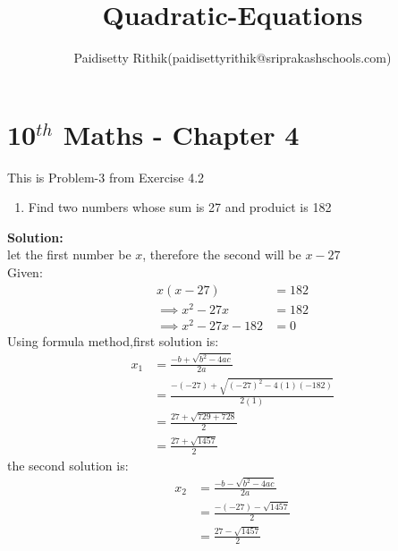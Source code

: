 \documentclass[12pt]{article}
\title{Quadratic-Equations}
\author{Paidisetty Rithik(paidisettyrithik@sriprakashschools.com)}
\newcommand{\solution}{\noindent \textbf{Solution: }}
\begin{document}
\maketitle
\section*{10$^{th}$ Maths - Chapter 4}
This is Problem-3 from Exercise 4.2
\begin{enumerate}
\item Find two numbers whose sum is 27 and produict is 182\\
\end{enumerate}
\solution \\
let the first number be $x$,
therefore the second will be $x-27$\\
Given:\\
\begin{align}
x(x-27) &= 182\\
\implies x^2-27x &= 182\\
\implies  x^2-27x-182 &= 0
\end{align}
Using formula method,first solution is:\\
\begin{align}
x_1 &= \frac{-b+\sqrt{b^2-4ac}}{2a}\\
&= \frac{-(-27)+\sqrt{(-27)^2-4(1)(-182)}}{2(1)}\\
&= \frac{27+\sqrt{729+728}}{2}\\
&= \frac{27+\sqrt{1457}}{2}
\end{align}
the second solution is:\\
\begin{align}
x_2 &= \frac{-b-\sqrt{b^2-4ac}}{2a}\\
&= \frac{-(-27)-\sqrt{1457}}{2}\\
&= \frac{27-\sqrt{1457}}{2}
\end{align}
\end{document}
